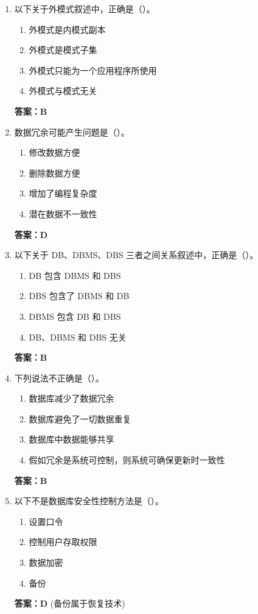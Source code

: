 \documentclass[12pt, a4paper]{article}
\begin{document}
\begin{enumerate}[label=\arabic*.]
    \item 以下关于外模式叙述中，正确是（\quad）。
    \begin{enumerate}
        \item 外模式是内模式副本
        \item 外模式是模式子集
        \item 外模式只能为一个应用程序所使用
        \item 外模式与模式无关
    \end{enumerate}
    \textbf{答案：B}

    \item 数据冗余可能产生问题是（\quad）。
    \begin{enumerate}
        \item 修改数据方便
        \item 删除数据方便
        \item 增加了编程复杂度
        \item 潜在数据不一致性
    \end{enumerate}
    \textbf{答案：D}

    \item 以下关于 DB、DBMS、DBS 三者之间关系叙述中，正确是（\quad）。
    \begin{enumerate}
        \item DB 包含 DBMS 和 DBS
        \item DBS 包含了 DBMS 和 DB
        \item DBMS 包含 DB 和 DBS
        \item DB、DBMS 和 DBS 无关
    \end{enumerate}
    \textbf{答案：B}

    \item 下列说法不正确是（\quad）。
    \begin{enumerate}
        \item 数据库减少了数据冗余
        \item 数据库避免了一切数据重复
        \item 数据库中数据能够共享
        \item 假如冗余是系统可控制，则系统可确保更新时一致性
    \end{enumerate}
    \textbf{答案：B}

    \item 以下不是数据库安全性控制方法是（\quad）。
    \begin{enumerate}
        \item 设置口令
        \item 控制用户存取权限
        \item 数据加密
        \item 备份
    \end{enumerate}
    \textbf{答案：D} (备份属于恢复技术)


\end{enumerate}
\end{document}
